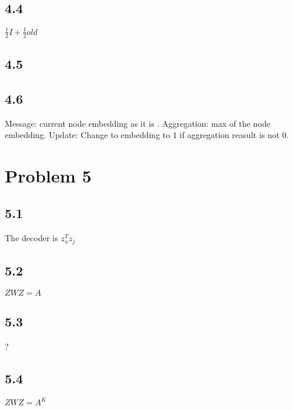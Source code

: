 \documentclass{book}
\begin{document}
\subsection*{4.4}
$\frac{1}{2} I + \frac{1}{2} old$


\subsection*{4.5}


\subsection*{4.6}
Message: current node embedding as it is . 
Aggregation: max of the node embedding. 
Update: Change to embedding to 1 if aggregation reasult is not 0. 



\section*{Problem 5}

\subsection*{5.1}
The decoder is $z_u^T z_j$


\subsection*{5.2}
$ZWZ = A$


\subsection*{5.3} 
? 

\subsection*{5.4}
$ZWZ = A^K$
\end{document}

